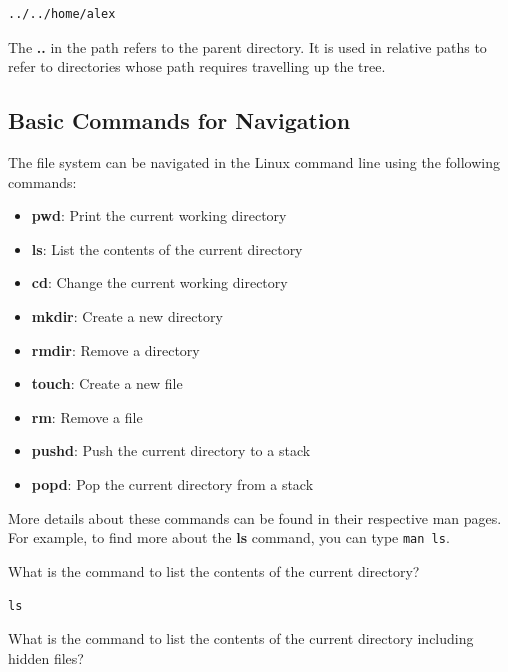 \begin{lstlisting}[language=bash]
  ../../home/alex
\end{lstlisting}

\begin{remark}
  The \textbf{..} in the path refers to the parent directory. It is used in relative paths to refer to directories whose path requires travelling up the tree.
\end{remark}

\subsection{Basic Commands for Navigation}
The file system can be navigated in the Linux command line using the following commands:
\begin{itemize}
  \item \textbf{pwd}: Print the current working directory
  \item \textbf{ls}: List the contents of the current directory
  \item \textbf{cd}: Change the current working directory
  \item \textbf{mkdir}: Create a new directory
  \item \textbf{rmdir}: Remove a directory
  \item \textbf{touch}: Create a new file
  \item \textbf{rm}: Remove a file
  \item \textbf{pushd}: Push the current directory to a stack
  \item \textbf{popd}: Pop the current directory from a stack
\end{itemize}

More details about these commands can be found in their respective
man pages. For example, to find more about the \textbf{ls} command,
you can type \texttt{man ls}.

\begin{qs}
  What is the command to list the contents of the current directory?
\end{qs}

\begin{ans}
  \texttt{ls}
\end{ans}


\begin{qs}
  What is the command to list the contents of the current directory
  including hidden files?
\end{qs}

